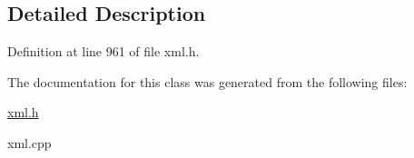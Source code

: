 \subsection{Detailed Description}


Definition at line 961 of file xml.h.



The documentation for this class was generated from the following files:\begin{DoxyCompactItemize}
\item 
\hyperlink{xml_8h}{xml.h}\item 
xml.cpp\end{DoxyCompactItemize}
